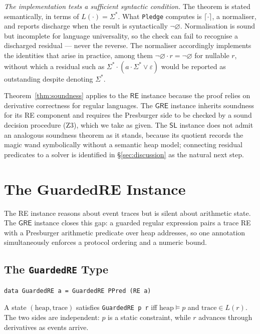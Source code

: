 \documentclass[acmsmall,screen]{acmart}
\newcommand{\RE}{\mathsf{RE}}
\newcommand{\GRE}{\mathsf{GRE}}
\newcommand{\SL}{\mathsf{SL}}
\newcommand{\norm}[1]{\lceil #1 \rceil}
\newcommand{\univ}{\neg\varnothing}
\begin{document}
\emph{The implementation tests a sufficient syntactic condition.}
The theorem is stated semantically, in terms of $L(\cdot) = \Sigma^*$.
What \lstinline{Pledge} computes is $\norm{\cdot}$, a normaliser, and
reports discharge when the result is syntactically $\univ$.
Normalisation is sound but incomplete for language universality, so the
check can fail to recognise a discharged residual --- never the reverse.
The normaliser accordingly implements the identities that arise in
practice, among them $\univ \cdot r = \univ$ for nullable $r$, without
which a residual such as $\Sigma^* \cdot (a \cdot \Sigma^* \vee \varepsilon)$
would be reported as outstanding despite denoting $\Sigma^*$.

\medskip\noindent
Theorem~\ref{thm:soundness} applies to the $\RE$ instance because the proof
relies on derivative correctness for regular languages.
The $\GRE$ instance inherits soundness for its RE component and requires the
Presburger side to be checked by a sound decision procedure (Z3), which we
take as given.
The $\SL$ instance does not admit an analogous soundness theorem as it stands,
because its quotient records the magic wand symbolically without a semantic
heap model; connecting residual predicates to a solver is identified in
\S\ref{sec:discussion} as the natural next step.

\section{The GuardedRE Instance}
\label{sec:gre-instance}

The RE instance reasons about event traces but is silent about arithmetic
state.
The $\GRE$ instance closes this gap: a guarded regular expression pairs
a trace RE with a Presburger arithmetic predicate over heap addresses,
so one annotation simultaneously enforces a protocol ordering and a
numeric bound.

\subsection{The \texttt{GuardedRE} Type}

\begin{lstlisting}
data GuardedRE a = GuardedRE PPred (RE a)
\end{lstlisting}

\noindent
A state $(\text{heap},\text{trace})$ satisfies \lstinline{GuardedRE p r} iff
$\text{heap} \models p$ and $\text{trace} \in L(r)$.
The two sides are independent: $p$ is a static constraint,
while $r$ advances through derivatives as events arrive.
\end{document}

